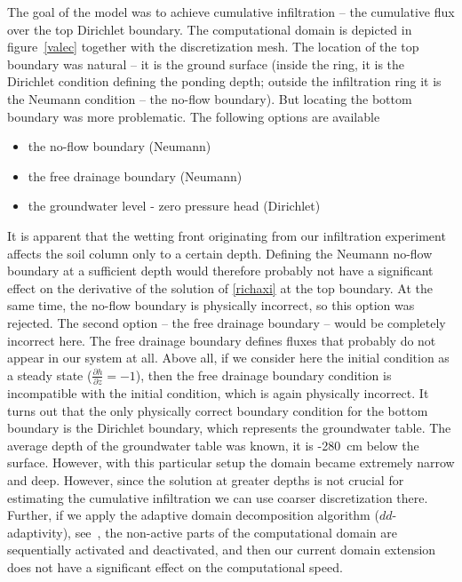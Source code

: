 \documentclass[review]{myarticle}
\begin{document}
The goal of the model was to achieve cumulative infiltration -- the cumulative flux over the top Dirichlet boundary.
The computational domain is depicted in figure~\ref{valec} together with the discretization mesh. The location of the top boundary was natural -- it is the ground surface (inside the ring, it is the Dirichlet condition defining the ponding depth; outside the infiltration ring it is the Neumann condition -- the no-flow boundary). But locating the bottom boundary was more problematic. The following options are available
\begin{itemize}
\item the no-flow boundary (Neumann)
\item the free drainage boundary (Neumann)
\item the groundwater level - zero pressure head (Dirichlet)
\end{itemize}
It is apparent that the wetting front originating from our infiltration experiment affects the soil column only to a certain depth. Defining the Neumann no-flow boundary at a sufficient depth would therefore probably not have a significant effect on the derivative of the solution of \eqref{richaxi} at the top boundary. At the same time, the no-flow boundary is physically incorrect, so this option was rejected. The second option -- the free drainage boundary -- would be completely incorrect here. The free drainage boundary defines fluxes that probably do not appear in our system at all. Above all, if we consider here the initial condition  as a steady state ($\frac{\partial h}{\partial z} = -1$), then the free drainage boundary condition is incompatible with the initial condition, which is again physically incorrect. It turns out that the only physically correct boundary condition for the bottom boundary is the Dirichlet boundary, which represents the groundwater table. The average depth of the groundwater table was known, it is -280~cm below the surface. However, with this particular setup the domain became extremely narrow and deep. However, since the solution at greater depths
is not crucial for estimating the cumulative infiltration we can use coarser  discretization there. Further, if we apply the   adaptive domain decomposition algorithm ($dd$-adaptivity), see~\citep{mojecomp, mojejcam2, mojeamc2},  the non-active parts of the computational domain are sequentially activated and deactivated, and then our current domain extension does not have a significant effect on the computational speed.

\end{document}
